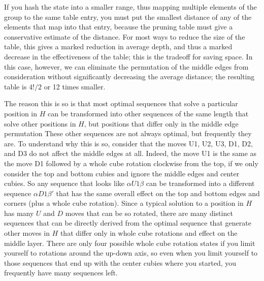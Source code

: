 If you hash the state into a smaller range, thus mapping multiple
elements of the group to the same table entry, you must put the
smallest distance of any of the elements that map into that entry,
because the pruning table must give a conservative estimate of the
distance.  For most ways to reduce the size of the table, this gives a
marked reduction in average depth, and thus a marked decrease in the
effectiveness of the table; this is the tradeoff for saving space.  In
this case, however, we can eliminate the permutation of the middle
edges from consideration without significantly decreasing the average
distance; the resulting table is $4!/2$ or 12 times smaller.

The reason this is so is that most optimal sequences that solve a
particular position in $H$ can be transformed into other sequences of
the same length that solve other positions in $H$, but positions that
differ only in the middle edge permutation These other sequences are
not always optimal, but frequently they are.  To understand why this
is so, consider that the moves U1, U2, U3, D1, D2, and D3 do not
affect the middle edges at all.  Indeed, the move U1 is the same as
the move D1 followed by a whole cube rotation clockwise from the top,
if we only consider the top and bottom cubies and ignore the middle
edges and center cubies.  So any sequence that looks like $\alpha U1
\beta$ can be transformed into a different sequence $\alpha D1 \beta'$
that has the same overall effect on the top and bottom edges and
corners (plus a whole cube rotation).  Since a typical solution to a
position in $H$ has many $U$ and $D$ moves that can be so rotated,
there are many distinct sequences that can be directly derived from
the optimal sequence that generate other moves in $H$ that differ only
in whole cube rotations and effect on the middle layer.  There are
only four possible whole cube rotation states if you limit yourself to
rotations around the up-down axis, so even when you limit yourself to
those sequences that end up with the center cubies where you started,
you frequently have many sequences left.

